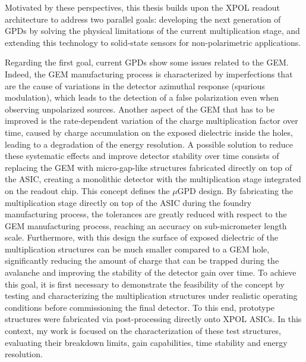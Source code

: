 Motivated by these perspectives, this thesis builds upon the XPOL readout architecture to address two parallel goals: developing the next generation of GPDs by solving the physical limitations of the current multiplication stage, and extending this technology to solid-state sensors for non-polarimetric applications.

Regarding the first goal, current GPDs show some issues related to the GEM. Indeed, the GEM manufacturing process is characterized by imperfections that are the cause of variations in the detector azimuthal response (spurious modulation), which leads to the detection of a false polarization even when observing unpolarized sources. Another aspect of the GEM that has to be improved is the rate-dependent variation of the charge multiplication factor over time, caused by charge accumulation on the exposed dielectric inside the holes, leading to a degradation of the energy resolution. A possible solution to reduce these systematic effects and improve detector stability over time consists of replacing the GEM with micro-gap-like structures fabricated directly on top of the ASIC, creating a monolithic detector with the multiplication stage integrated on the readout chip. This concept defines the $\mu$GPD design. By fabricating the multiplication stage directly on top of the ASIC during the foundry manufacturing process, the tolerances are greatly reduced with respect to the GEM manufacturing process, reaching an accuracy on sub-micrometer length scale. Furthermore, with this design the surface of exposed dielectric of the multiplication structures can be much smaller compared to a GEM hole, significantly reducing the amount of charge that can be trapped during the avalanche and improving the stability of the detector gain over time. To achieve this goal, it is first necessary to demonstrate the feasibility of the concept by testing and characterizing the multiplication structures under realistic operating conditions before commissioning the final detector. To this end, prototype structures were fabricated via post-processing directly onto XPOL ASICs. In this context, my work is focused on the characterization of these test structures, evaluating their breakdown limits, gain capabilities, time stability and energy resolution.

